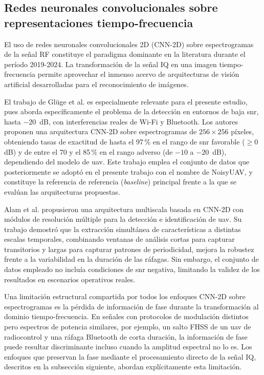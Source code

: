 \subsection{Redes neuronales convolucionales sobre representaciones tiempo-frecuencia}
\label{subsec:cnn_2d}

El uso de redes neuronales convolucionales 2D (CNN-2D) sobre espectrogramas de la
señal RF constituye el paradigma dominante en la literatura durante el período
2019-2024. La transformación de la señal IQ en una imagen tiempo-frecuencia permite
aprovechar el inmenso acervo de arquitecturas de visión artificial desarrolladas
para el reconocimiento de imágenes.

El trabajo de Glüge et al. \cite{gluge_robust_2024} es especialmente relevante para
el presente estudio, pues aborda específicamente el problema de la detección en
entornos de baja \gls{snr}, hasta $-20$\, dB, con interferencias reales de Wi-Fi y
Bluetooth. Los autores proponen una arquitectura CNN-2D sobre espectrogramas de
$256\times256$ píxeles, obteniendo tasas de exactitud de hasta el 97\,\% en el rango
de \gls{snr} favorable ($\geq 0$\, dB) y de entre el 70 y el 85\,\% en el rango
adverso (de $-10$ a $-20$\, dB), dependiendo del modelo de \gls{uav}. Este trabajo
emplea el conjunto de datos que posteriormente se adoptó en el presente trabajo con
el nombre de NoisyUAV, y constituye la referencia de referencia (\textit{baseline})
principal frente a la que se evalúan las arquitecturas propuestas.

Alam et al. \cite{alam_rf-enabled_2023} propusieron una arquitectura multiscala
basada en CNN-2D con módulos de resolución múltiple para la detección e identificación
de \gls{uav}. Su trabajo demostró que la extracción simultánea de características a
distintas escalas temporales, combinando ventanas de análisis cortas para capturar
transitorios y largas para capturar patrones de periodicidad, mejora la robustez
frente a la variabilidad en la duración de las ráfagas. Sin embargo, el conjunto
de datos empleado no incluía condiciones de \gls{snr} negativa, limitando la validez
de los resultados en escenarios operativos reales.

Una limitación estructural compartida por todos los enfoques CNN-2D sobre
espectrogramas es la pérdida de información de fase durante la transformación
al dominio tiempo-frecuencia. En señales con protocolos de modulación distintos
pero espectros de potencia similares, por ejemplo, un salto FHSS de un \gls{uav}
de radiocontrol y una ráfaga Bluetooth de corta duración, la información de
fase puede resultar discriminante incluso cuando la amplitud espectral no lo es.
Los enfoques que preservan la fase mediante el procesamiento directo de la señal
IQ, descritos en la subsección siguiente, abordan explícitamente esta limitación.


